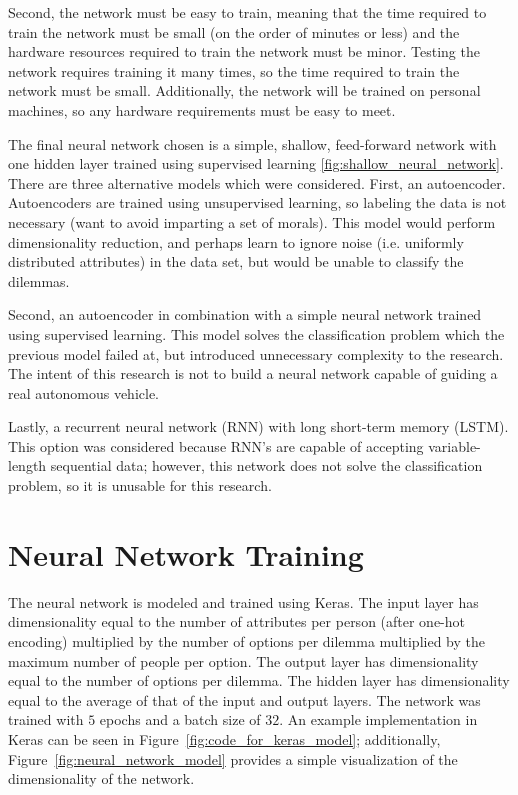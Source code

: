 \documentclass{report}
\begin{document}
Second, the network must be easy to train, meaning that the time required to train the network must
be small (on the order of minutes or less) and the hardware resources required to train the network
must be minor. Testing the network requires training it many times, so the time required to train
the network must be small. Additionally, the network will be trained on personal machines, so any
hardware requirements must be easy to meet.

The final neural network chosen is a simple, shallow, feed-forward network with one hidden layer
trained using supervised learning \ref{fig:shallow_neural_network}. There are three alternative
models which were considered. First, an autoencoder. Autoencoders are trained using unsupervised
learning, so labeling the data is not necessary (want to avoid imparting a set of morals). This
model would perform dimensionality reduction, and perhaps learn to ignore noise (i.e. uniformly
distributed attributes) in the data set, but would be unable to classify the dilemmas.

Second, an autoencoder in combination with a simple neural network trained using supervised
learning. This model solves the classification problem which the previous model failed at, but
introduced unnecessary complexity to the research. The intent of this research is not to build a
neural network capable of guiding a real autonomous vehicle.
    
Lastly, a recurrent neural network (RNN) with long short-term memory (LSTM). This option was
considered because RNN's are capable of accepting variable-length sequential data; however, this
network does not solve the classification problem, so it is unusable for this research.

\FloatBarrier
\section{Neural Network Training}

The neural network is modeled and trained using Keras. The input layer has dimensionality equal to
the number of attributes per person (after one-hot encoding) multiplied by the number of options per
dilemma multiplied by the maximum number of people per option. The output layer has dimensionality
equal to the number of options per dilemma. The hidden layer has dimensionality equal to the average
of that of the input and output layers. The network was trained with $5$ epochs and a batch size of
$32$. An example implementation in Keras can be seen in Figure~\ref{fig:code_for_keras_model};
additionally, Figure~\ref{fig:neural_network_model} provides a simple visualization of the
dimensionality of the network.
\end{document}
